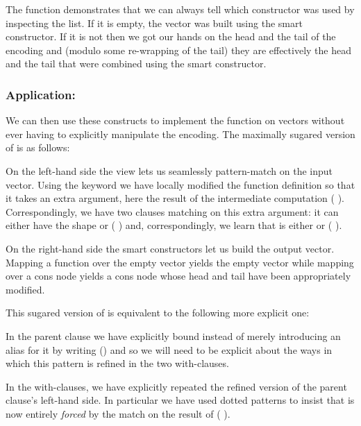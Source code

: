 The function  demonstrates that we can always tell which
constructor was used by inspecting the  list. If it
is empty, the vector was built using the  smart constructor.
If it is not then we got our hands on the head and the tail of the encoding
and (modulo some re-wrapping of the tail) they are effectively the head and the
tail that were combined using the smart constructor.

\subsubsection{Application: }

We can then use these constructs to implement the function 
on vectors without ever having to explicitly manipulate the encoding.
%
The maximally sugared version of  is as follows:


On the left-hand side the view lets us seamlessly pattern-match on the input
vector.
%
Using the  keyword we have locally modified the function
definition so that it takes an extra argument, here the result of the intermediate
computation ( ).
%
Correspondingly, we have two clauses matching on this extra argument: it can
either have the shape \IdrisData{[]} or ( \IdrisData{::} )
and, correspondingly, we learn that  is either \IdrisFunction{[]} or
( \IdrisFunction{::} ).

On the right-hand side the smart constructors let us build the output vector.
Mapping a function over the empty vector yields the empty vector while mapping
over a cons node yields a cons node whose head and tail have been appropriately
modified.


This sugared version of  is equivalent to the following more
explicit one:


In the parent clause we have explicitly bound 
instead of merely introducing an alias for it by writing
{(\IdrisKeyword{\_})}
and so we will need to be explicit about the ways in which this
pattern is refined in the two with-clauses.

In the with-clauses, we have explicitly repeated the refined version
of the parent clause's left-hand side. In particular we have used dotted
patterns to insist that  is now entirely \emph{forced}
by the match on the result of ( ).

